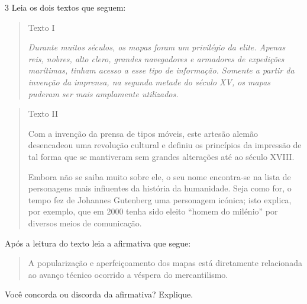 \num{3} Leia os dois textos que seguem:

\begin{quote}
Texto I

\emph{Durante muitos séculos, os mapas foram um privilégio da elite.
Apenas reis, nobres, alto clero, grandes navegadores e armadores de
expedições marítimas, tinham acesso a esse tipo de informação. Somente a
partir da invenção da imprensa, na segunda metade do século XV, os mapas
puderam ser mais amplamente utilizados.}

\end{quote}

\begin{quote}
Texto II

Com a invenção da prensa de tipos móveis, este artesão alemão
desencadeou uma revolução cultural e definiu os princípios da impressão
de tal forma que se mantiveram sem grandes alterações até ao século
XVIII.

Embora não se saiba muito sobre ele, o seu nome encontra-se na
lista de personagens mais infiuentes da história da humanidade. Seja
como for, o tempo fez de Johannes Gutenberg uma personagem icónica; isto
explica, por exemplo, que em 2000 tenha sido eleito ``homem do milénio''
por diversos meios de comunicação.

\end{quote}

Após a leitura do texto leia a afirmativa que segue:

\begin{quote}
A popularização e aperfeiçoamento dos mapas está diretamente relacionada
ao avanço técnico ocorrido a véspera do mercantilismo.
\end{quote}

Você concorda ou discorda da afirmativa? Explique.




